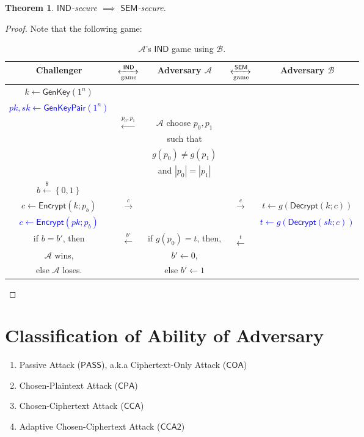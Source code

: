 \documentclass[12pt,openany]{book}
\newtheorem{theorem}{Theorem}[chapter]
\theoremstyle{definition}
\newcommand{\set}[1]{\left\{#1\right\}}
\newcommand{\of}[1]{\left( #1 \right)}
\newcommand{\abs}[1]{\left\lvert #1 \right\rvert}
\newcommand{\dollar}{\$}
\newcommand{\uniform}{\xleftarrow{\dollar}}
\newcommand{\A}{\mathcal{A}}
\newcommand{\IND}{\mathsf{IND}}
\newcommand{\PASS}{\mathsf{PASS}}
\newcommand{\CPA}{\mathsf{CPA}}
\newcommand{\CCA}{\mathsf{CCA}}
\newcommand{\CCATwo}{\mathsf{CCA2}}
\newcommand{\GenKey}{\mathsf{GenKey}}
\newcommand{\GenKeyPair}{\mathsf{GenKeyPair}}
\newcommand{\Encrypt}{\mathsf{Encrypt}}
\newcommand{\Decrypt}{\mathsf{Decrypt}}
\begin{document}
	\begin{tcolorbox}[colback=white,colframe=thmcolor,arc=5pt,title={\color{white}\bf }]
		\begin{theorem}
			$\IND$-secure $\implies$ $\mathsf{SEM}$-secure.
		\end{theorem}
	\end{tcolorbox}
	\begin{proof}
		Note that the following game: \begin{table}[h]
			\centering\begin{tabular}{ccccc}
				\toprule[1.5pt]
				Challenger & $\xleftrightarrow[\textnormal{game}]{\IND}$ & Adversary $\mathcal{A}$ & $\xleftrightarrow[\textnormal{game}]{\mathsf{SEM}}$ & Adversary $\mathcal{B}$ \\
				\midrule
				\textcolor{britishracinggreen}{$k\gets\GenKey(1^n)$}\\
				\textcolor{blue}{$pk,sk\gets\GenKeyPair(1^n)$}\\
				& \multirow{4}{*}{$\xleftarrow{p_0,p_1}$} & $\A$ choose $p_0,p_1$\\
				&& such that\\
				&& $g(p_0)\neq g(p_1)$ \\
				&& and $\abs{p_0}=\abs{p_1}$\\
				$b\uniform\set{0,1}$\\
				\midrule
				\textcolor{britishracinggreen}{$c\gets\Encrypt(k;p_b)$} & \multirow{2}{*}{$\xrightarrow{c}$} & & \multirow{2}{*}{$\xrightarrow{c}$} & \textcolor{britishracinggreen}{$t\gets g\of{\Decrypt(k;c)}$} \\
				\textcolor{blue}{$c\gets\Encrypt(pk;p_b)$} & & & & \textcolor{blue}{$t\gets g\of{\Decrypt(sk;c)}$}\\
				\midrule
				if $b=b'$, then & \multirow{3}{*}{$\xleftarrow{b'}$} & if $g(p_0)=t$, then, &\multirow{3}{*}{$\xleftarrow{\hat{t}}$} & \\
				$\mathcal{A}$ wins, & & $b'\gets 0$, & & \\
				else $\mathcal{A}$ loses. & & else $b'\gets 1$ & & \\
				\bottomrule[1.5pt]
			\end{tabular}
			\caption{$\mathcal{A}$'s $\IND$ game using $\mathcal{B}$.}
		\end{table}
	\end{proof}
	
	
	\newpage
	\section{Classification of Ability of Adversary}
	\begin{tcolorbox}[colback=white,colframe=defcolor,arc=5pt,title={\color{white}\bf }]
		\begin{enumerate}[(1)]
			\item Passive Attack ($\PASS$), a.k.a Ciphertext-Only Attack ($\mathsf{COA}$)
			\item Chosen-Plaintext Attack ($\CPA$)
			\item Chosen-Ciphertext Attack ($\CCA$)
			\item Adaptive Chosen-Ciphertext Attack ($\CCATwo$)
		\end{enumerate}
	\end{tcolorbox}
	
\end{document}
